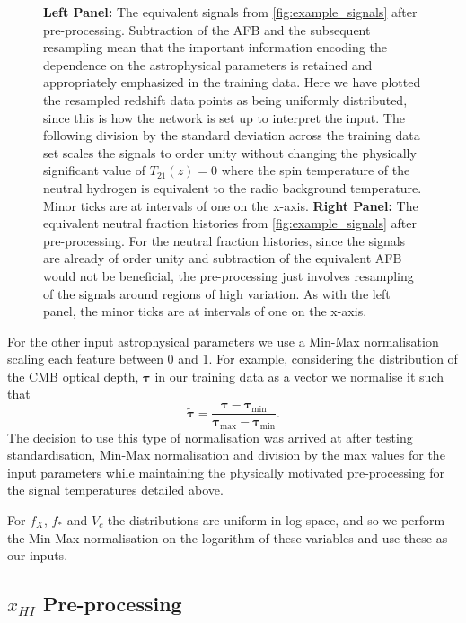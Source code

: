 \begin{figure}
    \caption{\textbf{Left Panel:} The equivalent signals from \cref{fig:example_signals} after pre-processing. Subtraction of the AFB and the subsequent resampling mean that the important information encoding the dependence on the astrophysical parameters is retained and appropriately emphasized in the training data. Here we have plotted the resampled redshift data points as being uniformly distributed, since this is how the network is set up to interpret the input. The following division by the standard deviation across the training data set scales the signals to order unity without changing the physically significant value of $T_{21}(z)=0$ where the spin temperature of the neutral hydrogen is equivalent to the radio background temperature. Minor ticks are at intervals of one on the x-axis. \textbf{Right Panel:} The equivalent neutral fraction histories from \cref{fig:example_signals} after pre-processing. For the neutral fraction histories, since the signals are already of order unity and subtraction of the equivalent AFB would not be beneficial, the pre-processing just involves resampling of the signals around regions of high variation. As with the left panel, the minor ticks are at intervals of one on the x-axis.}
    \label{fig:ppSignals}
\end{figure}

For the other input astrophysical parameters we use a Min-Max normalisation scaling each feature between 0 and 1. For example, considering the distribution of the CMB optical depth, $\boldsymbol{\tau}$ in our training data as a vector we normalise it such that
\begin{equation}
    \boldsymbol{\tilde{\tau}} = \frac{\boldsymbol{\tau} - \boldsymbol{\tau}_\mathrm{min}}{\boldsymbol{\tau}_\mathrm{max} - \boldsymbol{\tau}_\mathrm{min}}.
\end{equation}
The decision to use this type of normalisation was arrived at after testing standardisation, Min-Max normalisation and division by the max values for the input parameters while maintaining the physically motivated pre-processing for the signal temperatures detailed above. 

For $f_X$, $f_*$ and $V_c$ the distributions are uniform in log-space, and so we perform the Min-Max normalisation on the logarithm of these variables and use these as our inputs.

\subsection{$x_{HI}$ Pre-processing}
\label{neutral frac pp}

